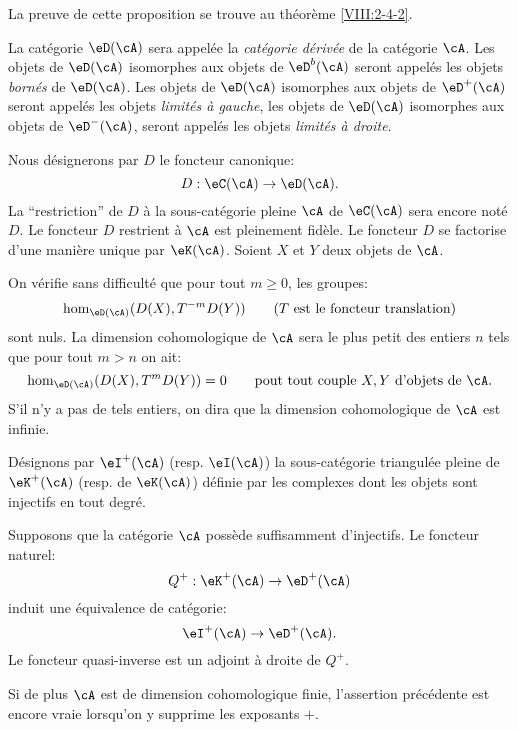 La preuve de cette proposition se trouve au théorème \ref{VIII:2-4-2}. 





\begin{definition}\label{VIII:3-1-3}
La catégorie $\eD(\cA)$ sera appelée la \emph{catégorie dérivée} de la 
catégorie $\cA$. Les objets de $\eD(\cA)$ isomorphes aux objets de $\eD^b(\cA)$ 
seront appelés les objets \emph{bornés} de $\eD(\cA)$. Les objets de 
$\eD(\cA)$ isomorphes aux objets de $\eD^+(\cA)$ seront appelés les objets 
\emph{limités à gauche}, les objets de $\eD(\cA)$ isomorphes aux objets de 
$\eD^-(\cA)$, seront appelés les objets \emph{limités à droite}. 
\end{definition}

Nous désignerons par $D$ le foncteur canonique: 
\[
  D : \eC(\cA) \to \eD(\cA) \text{.}
\]
La ``restriction'' de $D$ à la sous-catégorie pleine $\cA$ de $\eC(\cA)$ 
sera encore noté $D$. Le foncteur $D$ restrient à $\cA$ est pleinement 
fidèle. Le foncteur $D$ se factorise d'une manière unique par $\eK(\cA)$. 
Soient $X$ et $Y$ deux objets de $\cA$. 

On vérifie sans difficulté que pour tout $m\geqslant 0$, les groupes: 
\[
  \hom_{\eD(\cA)}(D(X),T^{-m} D(Y)) \qquad \text{($T$ est le foncteur translation)} 
\]
sont nuls. La dimension cohomologique de $\cA$ sera le plus petit des entiers 
$n$ tels que pour tout $m>n$ on ait: 
\[
  \hom_{\eD(\cA)}(D(X),T^m D(Y)) = 0 \qquad\text{pout tout couple $X,Y$ d'objets de $\cA$.} 
\]
S'il n'y a pas de tels entiers, on dira que la dimension cohomologique de $\cA$ 
est infinie. 

Désignons par $\eI^+(\cA)$ (resp. $\eI(\cA)$) la sous-catégorie triangulée 
pleine de $\eK^+(\cA)$ (resp. de $\eK(\cA)$) définie par les complexes dont 
les objets sont injectifs en tout degré. 





\begin{proposition}\label{VIII:3-1-4}
Supposons que la catégorie $\cA$ possède suffisamment d'injectifs. Le 
foncteur naturel: 
\[
  Q^+:\eK^+(\cA) \to \eD^+(\cA) 
\]
induit une équivalence de catégorie: 
\[
  \eI^+(\cA) \to \eD^+(\cA)  \text{.}
\]
Le foncteur quasi-inverse est un adjoint à droite de $Q^+$. 
\end{proposition}

Si de plus $\cA$ est de dimension cohomologique finie, l'assertion 
précédente est encore vraie lorsqu'on y supprime les exposants $+$. 

